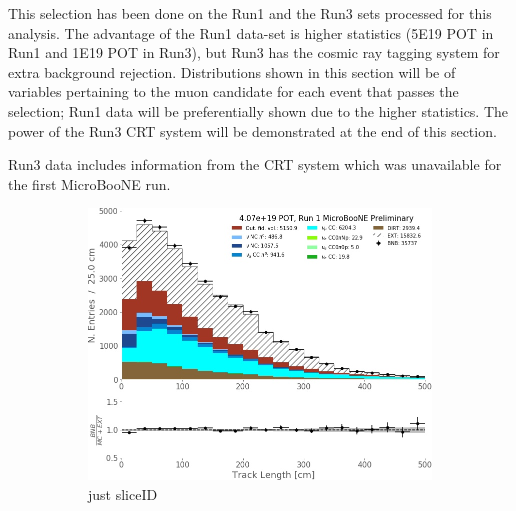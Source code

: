 \par This selection has been done on the Run1 and the Run3 sets processed for this analysis. The advantage of the Run1 data-set is higher statistics (5E19 POT in Run1 and 1E19 POT in Run3), but Run3 has the cosmic ray tagging system for extra background rejection. Distributions shown in this section will be of variables pertaining to the muon candidate for each event that passes the selection; Run1 data will be preferentially shown due to the higher statistics. The power of the Run3 CRT system will be demonstrated at the end of this section.

\par Run3 data includes information from the CRT system which was unavailable for the first MicroBooNE run. 

\begin{figure}[ht] 
\begin{center}
    \begin{subfigure}[b]{0.45\textwidth}
    \centering
    \includegraphics[width=1.00\textwidth]{NuMuCCsel/Images/Ryan/Run1_trklen_sliceID.jpg}
    \caption{\label{fig:NuMUCCsel:ryan:trklenSliceID} just sliceID}
    \end{subfigure}
    \begin{subfigure}[b]{0.45\textwidth}
    \centering

\end{subfigure}
\end{center}
\end{figure}
